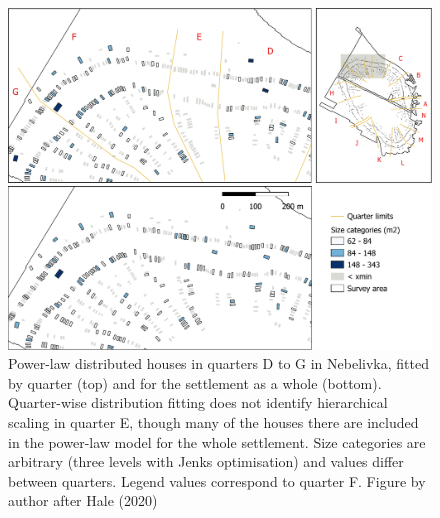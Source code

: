 \documentclass[
  12pt,
  a4paper, twoside]{book}
\begin{document}
\begin{figure}

{\centering \includegraphics[width=0.9\linewidth]{Results/fig06_quart_map} 

}

\caption[Settlement plan of Nebelivka, power laws by quarter (details)]{Power-law distributed houses in quarters D to G in Nebelivka, fitted by quarter (top) and for the settlement as a whole (bottom). Quarter-wise distribution fitting does not identify hierarchical scaling in quarter E, though many of the houses there are included in the power-law model for the whole settlement. Size categories are arbitrary (three levels with Jenks optimisation) and values differ between quarters. Legend values correspond to quarter F. Figure by author after Hale (2020)}\label{fig:06-quart-map}
\end{figure}
\end{document}
